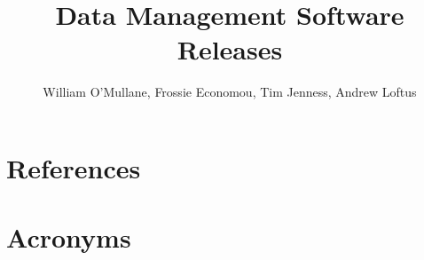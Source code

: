 \documentclass[DM,lsstdraft]{lsstdoc}
\title[DM Releases ]{ Data Management Software Releases}
\author   {William O'Mullane, Frossie Economou, Tim Jenness, Andrew Loftus}
\begin{document}
%
%
\maketitle

%
%



\section{References\label{sect:references}}
\renewcommand{\refname}{}


\section{Acronyms}
\end{document}
